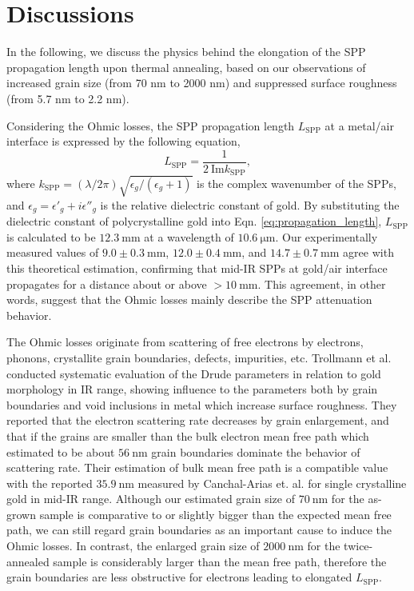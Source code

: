 \documentclass[aip,apl,reprint]{revtex4-1}
\begin{document}
\section{Discussions}
\label{sec:discussion}
In the following, we discuss the physics behind the elongation of the SPP propagation length upon thermal annealing, based on our observations of increased grain size (from 70 nm to 2000 nm) and suppressed surface roughness (from 5.7 nm to 2.2 nm). 

Considering the Ohmic losses, the SPP propagation length $L_{\mathrm{SPP}}$ at a metal/air interface is expressed by the following equation,
\begin{equation}
 L_{\mathrm{SPP}} = \frac{1}{2\:\mathrm{Im} k_{\mathrm{SPP}}},
\label{eq:propagation_length}
 \end{equation}
where $k_{\mathrm{SPP}}=(\lambda/2\pi)\sqrt{\epsilon_g/(\epsilon_g+1)}$ is the complex wavenumber of the SPPs, and $\epsilon_g=\epsilon'_g+i\epsilon''_g$ is the relative dielectric constant of gold. 
By substituting the dielectric constant of polycrystalline gold\cite{Palik} into Eqn. \ref{eq:propagation_length}, $L_{\mathrm{SPP}}$ is calculated to be $12.3\:\mathrm{mm}$ at a wavelength of $10.6\:\mathrm{\mu m}$.
Our experimentally measured values of $9.0\pm0.3\:\mathrm{mm}$, $12.0\pm0.4\:\mathrm{mm}$, and $14.7\pm0.7\:\mathrm{mm}$ agree with this theoretical estimation, confirming that mid-IR SPPs at gold/air interface propagates for a distance about or above $>10\:\mathrm{mm}$. 
This agreement, in other words, suggest that the Ohmic losses mainly describe the SPP attenuation behavior.

The Ohmic losses originate from scattering of free electrons by electrons, phonons, crystallite grain boundaries, defects, impurities\cite{Yang}, etc. Trollmann et al.\cite{Trollmann} conducted systematic evaluation of the Drude parameters in relation to gold morphology in IR range, showing influence to the parameters both by grain boundaries and void inclusions in metal which increase surface roughness. 
They reported that the electron scattering rate decreases by grain enlargement, and that if the grains are smaller than the bulk electron mean free path which estimated to be about $56\:\mathrm{nm}$ grain boundaries dominate the behavior of scattering rate. 
Their estimation of bulk mean free path is a compatible value with the reported $35.9\:\mathrm{nm}$ measured by Canchal-Arias et. al.\cite{Canchal-Arias} for single crystalline gold in mid-IR range. Although our estimated grain size of $70\:\mathrm{nm}$ for the as-grown sample is comparative to or slightly bigger than the expected mean free path, we can still regard grain boundaries as an important cause to induce the Ohmic losses. In contrast, the enlarged grain size of $2000\:\mathrm{nm}$ for the twice-annealed sample is considerably larger than the mean free path, therefore the grain boundaries are less obstructive for electrons leading to elongated $L_{\mathrm{SPP}}$. 
\end{document}
